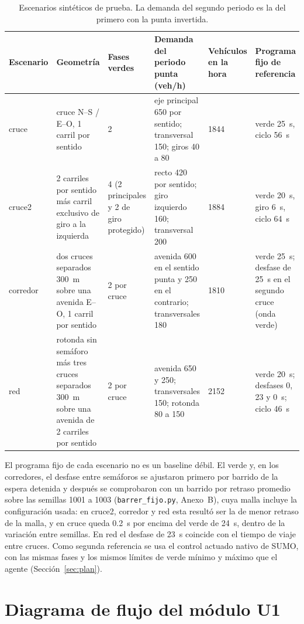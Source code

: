 \begin{table}[H]
\centering
\small
\setlength{\tabcolsep}{3pt}
\begin{tabular}{p{1.3cm}p{3.4cm}p{1.4cm}p{3.4cm}p{1.2cm}p{2.1cm}}
\toprule
Escenario & Geometría & Fases verdes & Demanda del periodo punta (veh/h) & Vehículos en la hora & Programa fijo de referencia \\
\midrule
cruce & cruce N--S / E--O, 1 carril por sentido & 2 & eje principal 650 por sentido; transversal 150; giros 40 a 80 & 1844 & verde 25~s, ciclo 56~s \\
cruce2 & 2 carriles por sentido más carril exclusivo de giro a la izquierda & 4 (2 principales y 2 de giro protegido) & recto 420 por sentido; giro izquierdo 160; transversal 200 & 1884 & verde 20~s, giro 6~s, ciclo 64~s \\
corredor & dos cruces separados 300~m sobre una avenida E--O, 1 carril por sentido & 2 por cruce & avenida 600 en el sentido punta y 250 en el contrario; transversales 180 & 1810 & verde 25~s; desfase de 25~s en el segundo cruce (onda verde) \\
red & rotonda sin semáforo más tres cruces separados 300~m sobre una avenida de 2 carriles por sentido & 2 por cruce & avenida 650 y 250; transversales 150; rotonda 80 a 150 & 2152 & verde 20~s; desfases 0, 23 y 0~s; ciclo 46~s \\
\bottomrule
\end{tabular}
\caption{Escenarios sintéticos de prueba. La demanda del segundo periodo es la del primero con la punta invertida.}
\label{tab:escenarios}
\end{table}

El programa fijo de cada escenario no es un baseline débil. El verde y,
en los corredores, el desfase entre semáforos se ajustaron primero por
barrido de la espera detenida y después se comprobaron con un barrido
por retraso promedio sobre las semillas 1001 a 1003
(\texttt{barrer\_fijo.py}, Anexo~B), cuya malla incluye la
configuración usada: en cruce2, corredor y red esta resultó ser la de
menor retraso de la malla, y en cruce queda 0.2~s por encima del verde
de 24~s, dentro de la variación entre semillas. En red el desfase de
23~s coincide con el tiempo de viaje entre cruces. Como segunda referencia se usa el control actuado
nativo de SUMO, con las mismas fases y los mismos límites de verde
mínimo y máximo que el agente (Sección~\ref{sec:plan}).

\section{Diagrama de flujo del módulo U1}

